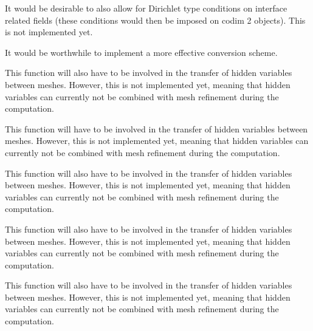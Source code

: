 \begin{DoxyRefList}
%
It would be desirable to also allow for Dirichlet type conditions on interface related fields (these conditions would then be imposed on codim 2 objects). This is not implemented yet. 
\item[Member \mbox{\hyperlink{class_do_f_renumbering_offset_a5df6c4b70b1394c3670ced634146c9a9}{Do\+FRenumbering\+Offset\+::dof\+\_\+offsets}} ]\label{todo__todo000011}%
%
It would be worthwhile to implement a more effective conversion scheme.  
\item[Member \mbox{\hyperlink{classparallel_1_1_triangulation_system_a951181f2ad877283d458fa19db42efb2}{parallel\+::Triangulation\+System$<$ spacedim $>$\+::post\+\_\+refinement\+\_\+domain}} ()]\label{todo__todo000016}%
%
This function will also have to be involved in the transfer of hidden variables between meshes. However, this is not implemented yet, meaning that hidden variables can currently not be combined with mesh refinement during the computation.  
\item[Member \mbox{\hyperlink{classparallel_1_1_triangulation_system_a79e9789e83e12900c85cf8de0644271f}{parallel\+::Triangulation\+System$<$ spacedim $>$\+::pre\+\_\+refinement\+\_\+domain}} ()]\label{todo__todo000015}%
%
This function will have to be involved in the transfer of hidden variables between meshes. However, this is not implemented yet, meaning that hidden variables can currently not be combined with mesh refinement during the computation.  
\item[Member \mbox{\hyperlink{class_triangulation_system_a62be2563cc8d810a71941e15490f9840}{Triangulation\+System$<$ spacedim $>$\+::execute\+\_\+coarsening\+\_\+and\+\_\+refinement}} ()]\label{todo__todo000014}%
%
This function will also have to be involved in the transfer of hidden variables between meshes. However, this is not implemented yet, meaning that hidden variables can currently not be combined with mesh refinement during the computation.  
\item[Member \mbox{\hyperlink{class_triangulation_system_a8435489384095f687363d200ccfce628}{Triangulation\+System$<$ spacedim $>$\+::post\+\_\+refinement\+\_\+domain}} ()]\label{todo__todo000013}%
%
This function will also have to be involved in the transfer of hidden variables between meshes. However, this is not implemented yet, meaning that hidden variables can currently not be combined with mesh refinement during the computation.  
\item[Member \mbox{\hyperlink{class_triangulation_system_ae1862e6da3157dc8d539fdc0439e9f48}{Triangulation\+System$<$ spacedim $>$\+::pre\+\_\+refinement\+\_\+domain}} ()]\label{todo__todo000012}%
%
This function will also have to be involved in the transfer of hidden variables between meshes. However, this is not implemented yet, meaning that hidden variables can currently not be combined with mesh refinement during the computation. 
\end{DoxyRefList}